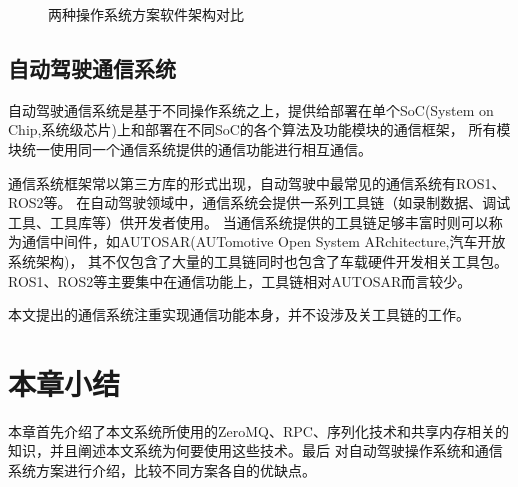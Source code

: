 \begin{figure}[H]
  \centering
  \caption{两种操作系统方案软件架构对比}
  \label{ad_os_compare}
\end{figure}

\subsection{自动驾驶通信系统}
自动驾驶通信系统是基于不同操作系统之上，提供给部署在单个SoC(System on Chip,系统级芯片)上和部署在不同SoC的各个算法及功能模块的通信框架，
所有模块统一使用同一个通信系统提供的通信功能进行相互通信。

通信系统框架常以第三方库的形式出现，自动驾驶中最常见的通信系统有ROS1、ROS2等。
在自动驾驶领域中，通信系统会提供一系列工具链（如录制数据、调试工具、工具库等）供开发者使用。
当通信系统提供的工具链足够丰富时则可以称为通信中间件，如AUTOSAR(AUTomotive Open System ARchitecture,汽车开放系统架构)，
其不仅包含了大量的工具链同时也包含了车载硬件开发相关工具包。ROS1、ROS2等主要集中在通信功能上，工具链相对AUTOSAR而言较少。

本文提出的通信系统注重实现通信功能本身，并不设涉及关工具链的工作。

\section{本章小结}
本章首先介绍了本文系统所使用的ZeroMQ、RPC、序列化技术和共享内存相关的知识，并且阐述本文系统为何要使用这些技术。最后
对自动驾驶操作系统和通信系统方案进行介绍，比较不同方案各自的优缺点。
